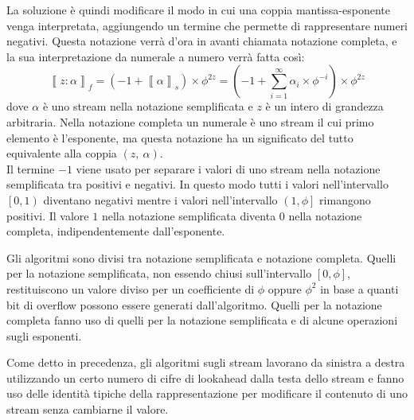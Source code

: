 \documentclass[Lau,oneside]{sapthesis}
\begin{document}
La soluzione è quindi modificare il modo in cui una coppia mantissa-esponente venga interpretata, aggiungendo un termine che permette di rappresentare numeri negativi. Questa notazione verrà d'ora in avanti chiamata notazione completa, e la sua interpretazione da numerale a numero verrà fatta così:
$$\left\llbracket z:\alpha \right\rrbracket_f = \left( -1 + \left\llbracket \alpha \right\rrbracket_s \right) \times \phi^{2z} = \left( -1 + \sum_{i=1}^{\infty} \alpha_i \times \phi^{-i} \right) \times \phi^{2z}$$
dove $\alpha$ è uno stream nella notazione semplificata e $z$ è un intero di grandezza arbitraria. Nella notazione completa un numerale è uno stream il cui primo elemento è l'esponente, ma questa notazione ha un significato del tutto equivalente alla coppia $(z, \ \alpha)$.\\
Il termine $-1$ viene usato per separare i valori di uno stream nella notazione semplificata tra positivi e negativi. In questo modo tutti i valori nell'intervallo $\left[0,1\right)$ diventano negativi mentre i valori nell'intervallo $\left(1,\phi\right]$ rimangono positivi. Il valore $1$ nella notazione semplificata diventa $0$ nella notazione completa, indipendentemente dall'esponente.

Gli algoritmi sono divisi tra notazione semplificata e notazione completa. Quelli per la notazione semplificata, non essendo chiusi sull'intervallo $\left[0,\phi\right]$, restituiscono un valore diviso per un coefficiente di $\phi$ oppure $\phi^2$ in base a quanti bit di overflow possono essere generati dall'algoritmo. Quelli per la notazione completa fanno uso di quelli per la notazione semplificata e di alcune operazioni sugli esponenti.

Come detto in precedenza, gli algoritmi sugli stream lavorano da sinistra a destra utilizzando un certo numero di cifre di lookahead dalla testa dello stream e fanno uso delle identità tipiche della rappresentazione per modificare il contenuto di uno stream senza cambiarne il valore.
\end{document}
